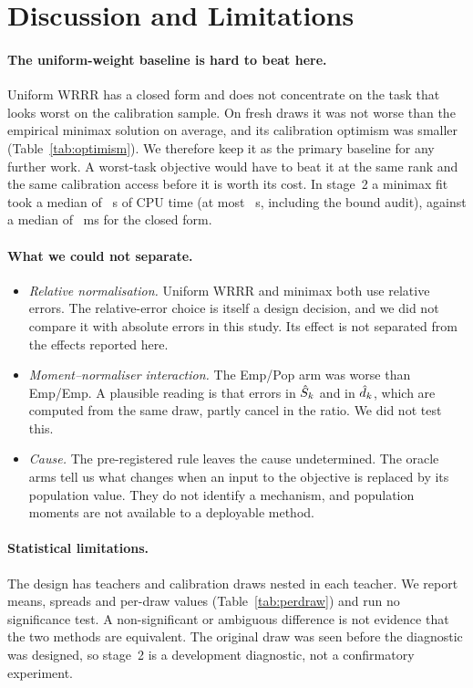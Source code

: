 \section{Discussion and Limitations}
\label{sec:discussion}

\paragraph{The uniform-weight baseline is hard to beat here.} Uniform WRRR has a closed form and
does not concentrate on the task that looks worst on the calibration sample. On fresh draws it was
not worse than the empirical minimax solution on average, and its calibration optimism was smaller
(Table~\ref{tab:optimism}). We therefore keep it as the primary baseline for any further work. A
worst-task objective would have to beat it at the same rank and the same calibration access
before it is worth its cost. In stage~2 a minimax fit took a median of \STwoMinimaxCPUMedian~s
of CPU time (at most \STwoMinimaxCPUMax~s, including the bound audit), against a median of
\STwoUniformCPUMedianMs~ms for the closed form.

\paragraph{What we could not separate.}
\begin{itemize}
\item \emph{Relative normalisation.} Uniform WRRR and minimax both use relative errors. The
relative-error choice is itself a design decision, and we did not compare it with absolute errors
in this study. Its effect is not separated from the effects reported here.
\item \emph{Moment--normaliser interaction.} The Emp/Pop arm was worse than Emp/Emp. A plausible
reading is that errors in $\hat{S}_k$ and in $\hat{d}_k$, which are computed from the same draw, partly
cancel in the ratio. We did not test this.
\item \emph{Cause.} The pre-registered rule leaves the cause undetermined. The oracle arms tell us
what changes when an input to the objective is replaced by its population value. They do not
identify a mechanism, and population moments are not available to a deployable method.
\end{itemize}

\paragraph{Statistical limitations.} The design has \CfgNTeachers{} teachers and \CfgNResamples{}
calibration draws nested in each teacher. We report means, spreads and per-draw values
(Table~\ref{tab:perdraw}) and run no significance test. A non-significant or ambiguous difference
is not evidence that the two methods are equivalent. The original draw was seen before the
diagnostic was designed, so stage~2 is a development diagnostic, not a confirmatory experiment.


